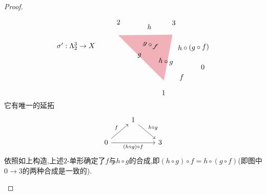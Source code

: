 \begin{proof}
\begin{enumerate}
\[\begin{tikzpicture}[x=0.75pt,y=0.75pt,yscale=-1,xscale=1]
\draw [draw opacity=0][fill={rgb, 255:red, 208; green, 2; blue, 27 }  ,fill opacity=0.3 ]   (277.11,135.11) -- (378.11,134.11) -- (362.11,220.11) -- cycle ;
\draw (161.73,146.92) node [anchor=north west][inner sep=0.75pt]    {$\sigma ':\Lambda _{2}^{3}\rightarrow X$};
\draw (357,237.4) node [anchor=north west][inner sep=0.75pt]    {$1$};
\draw (273.02,105.17) node [anchor=north west][inner sep=0.75pt]    {$2$};
\draw (430,189.4) node [anchor=north west][inner sep=0.75pt]    {$0$};
\draw (376,106.4) node [anchor=north west][inner sep=0.75pt]    {$3$};
\draw (390.11,207.01) node [anchor=north west][inner sep=0.75pt]    {$f$};
\draw (312,167.4) node [anchor=north west][inner sep=0.75pt]    {$g$};
\draw (325.43,141.38) node [anchor=north west][inner sep=0.75pt]  [rotate=-19.28]  {$g\circ f$};
\draw (330,113.4) node [anchor=north west][inner sep=0.75pt]    {$h$};
\draw (351.95,175.66) node [anchor=north west][inner sep=0.75pt]  [rotate=-6.42]  {$h\circ g$};
\draw (386.69,151.9) node [anchor=north west][inner sep=0.75pt]  [rotate=-357.41]  {$h\circ ( g\circ f)$};
        \end{tikzpicture}\]
        它有唯一的延拓
        \[\begin{tikzcd}
	& 1 \\
	0 && 3
	\arrow["{h\circ g}", from=1-2, to=2-3]
	\arrow["f", from=2-1, to=1-2]
	\arrow["{(h\circ g)\circ f}"', from=2-1, to=2-3]
        \end{tikzcd}\]
        依照如上构造,上述$2$-单形确定了$f$与$h\circ g$的合成,即$(h\circ g) \circ f= h\circ (g\circ f)$(即图中$0 \to 3$的两种合成是一致的).\\
        

\end{enumerate}
\end{proof}
